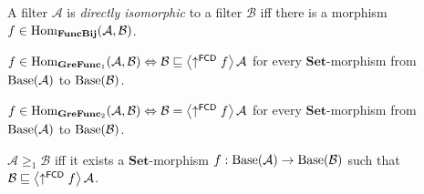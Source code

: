 \begin{defn}
A filter $\mathcal{A}$ is \emph{directly
isomorphic} to a filter $\mathcal{B}$ iff there is a morphism $f\in\operatorname{Hom}_{\mathbf{FuncBij}}(\mathcal{A},\mathcal{B})$.\end{defn}
\begin{obvious}
$f\in\operatorname{Hom}_{\mathbf{GreFunc}_{1}}(\mathcal{A},\mathcal{B})\Leftrightarrow\mathcal{B}\sqsubseteq\left\langle \uparrow^{\mathsf{FCD}}f\right\rangle\mathcal{A}$
for every $\mathbf{Set}$-morphism from $\operatorname{Base}(\mathcal{A})$ to $\operatorname{Base}(\mathcal{B})$.
\end{obvious}

\begin{obvious}
$f\in\operatorname{Hom}_{\mathbf{GreFunc}_{2}}(\mathcal{A},\mathcal{B})\Leftrightarrow\mathcal{B}=\left\langle \uparrow^{\mathsf{FCD}}f\right\rangle\mathcal{A}$
for every $\mathbf{Set}$-morphism from $\operatorname{Base}(\mathcal{A})$ to $\operatorname{Base}(\mathcal{B})$.
\end{obvious}

\begin{cor}
$\mathcal{A}\ge_{1}\mathcal{B}$ iff it exists a $\mathbf{Set}$-morphism
$f:\operatorname{Base}(\mathcal{A})\rightarrow\operatorname{Base}(\mathcal{B})$ such that $\mathcal{B}\sqsubseteq\left\langle \uparrow^{\mathsf{FCD}}f\right\rangle\mathcal{A}$.
\end{cor}

